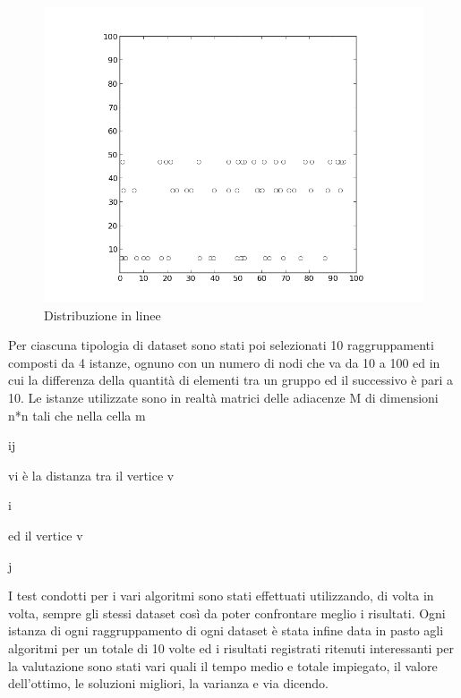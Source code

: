 \documentclass[preprint,12pt]{elsarticle}
\begin{document}
\begin{figure}[htbp]
\centering
\includegraphics[scale=0.50]{grafici_istanze/line_60.png} 
\caption{Distribuzione in linee}\label{fig:4}
\end{figure}

Per ciascuna tipologia di dataset sono stati poi selezionati 10 raggruppamenti composti da 4 istanze, ognuno con un numero di nodi che va da 10 a 100 ed in cui la differenza della quantità di elementi tra un gruppo ed il successivo è pari a 10. Le istanze utilizzate sono in realtà matrici delle adiacenze M di dimensioni n*n tali che nella cella m\begin{tiny}ij\end{tiny} vi è la distanza tra il vertice v\begin{tiny}i\end{tiny} ed il vertice v\begin{tiny}j\end{tiny}

I test condotti per i vari algoritmi sono stati effettuati utilizzando, di volta in volta, sempre gli stessi dataset così da poter confrontare meglio i risultati. Ogni istanza di ogni raggruppamento di ogni dataset è stata infine data in pasto agli algoritmi per un totale di 10 volte ed i risultati registrati ritenuti interessanti per la valutazione sono stati vari quali il tempo medio e totale impiegato, il valore dell'ottimo, le soluzioni migliori, la varianza e via dicendo.
\end{document}
